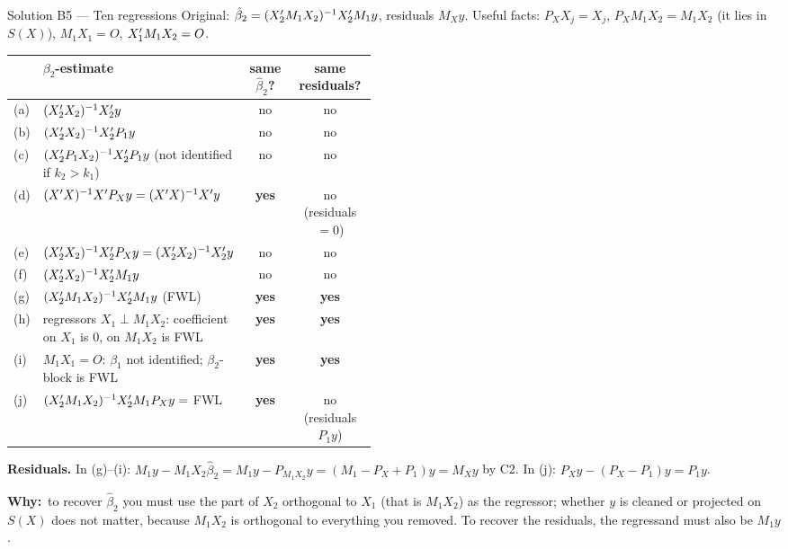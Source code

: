 \documentclass[11pt]{article}
\newcommand{\step}[1]{\par\smallskip\noindent\textbf{\textcolor{qnavy}{#1}}\quad\ignorespaces}
\newcommand{\Why}{\textbf{\textcolor{whyline}{Why:}}\ }
\begin{document}
\begin{solbox}{Solution B5 --- Ten regressions}
Original: $\hat\beta_{2} = (X_{2}^{\prime} M_{1}X_{2})^{-1}X_{2}^{\prime} M_{1}y$, residuals $M_{X}y$.
Useful facts: $P_{X}X_{j} = X_{j}$, $P_{X}M_{1}X_{2} = M_{1}X_{2}$ (it lies in $S(X)$), $M_{1}X_{1} = O$,
$X_{1}^{\prime} M_{1}X_{2} = O$.
\begin{center}
\renewcommand{\arraystretch}{1.2}
\small
\begin{tabular}{l p{0.47\linewidth} c c}
\toprule
 & $\beta_{2}$-estimate & same $\hat\beta_{2}$? & same residuals? \\
\midrule
(a) & $(X_{2}^{\prime} X_{2})^{-1}X_{2}^{\prime} y$ & no & no \\
(b) & $(X_{2}^{\prime} X_{2})^{-1}X_{2}^{\prime} P_{1}y$ & no & no \\
(c) & $(X_{2}^{\prime} P_{1}X_{2})^{-1}X_{2}^{\prime} P_{1}y$ (not identified if $k_{2} > k_{1}$) & no & no \\
(d) & $(X^{\prime} X)^{-1}X^{\prime} P_{X}y = (X^{\prime} X)^{-1}X^{\prime} y$ & \textbf{yes} & no (residuals $= 0$) \\
(e) & $(X_{2}^{\prime} X_{2})^{-1}X_{2}^{\prime} P_{X}y = (X_{2}^{\prime} X_{2})^{-1}X_{2}^{\prime} y$ & no & no \\
(f) & $(X_{2}^{\prime} X_{2})^{-1}X_{2}^{\prime} M_{1}y$ & no & no \\
(g) & $(X_{2}^{\prime} M_{1}X_{2})^{-1}X_{2}^{\prime} M_{1}y$ (FWL) & \textbf{yes} & \textbf{yes} \\
(h) & regressors $X_{1} \perp M_{1}X_{2}$: coefficient on $X_{1}$ is $0$, on $M_{1}X_{2}$ is FWL & \textbf{yes} & \textbf{yes} \\
(i) & $M_{1}X_{1} = O$: $\beta_{1}$ not identified; $\beta_{2}$-block is FWL & \textbf{yes} & \textbf{yes} \\
(j) & $(X_{2}^{\prime} M_{1}X_{2})^{-1}X_{2}^{\prime} M_{1}P_{X}y = $ FWL & \textbf{yes} & no (residuals $P_{1}y$) \\
\bottomrule
\end{tabular}
\end{center}
\step{Residuals.} In (g)--(i): $M_{1}y - M_{1}X_{2}\hat\beta_{2} = M_{1}y - P_{M_{1}X_{2}}y
= (M_{1} - P_{X} + P_{1})y = M_{X}y$ by C2. In (j): $P_{X}y - (P_{X} - P_{1})y = P_{1}y$.
\begin{why}\Why to recover $\hat\beta_{2}$ you must use the part of $X_{2}$ orthogonal to
$X_{1}$ (that is $M_{1}X_{2}$) as the regressor; whether $y$ is cleaned or projected on $S(X)$
does not matter, because $M_{1}X_{2}$ is orthogonal to everything you removed. To recover
the residuals, the regressand must also be $M_{1}y$.\end{why}
\end{solbox}
\end{document}
